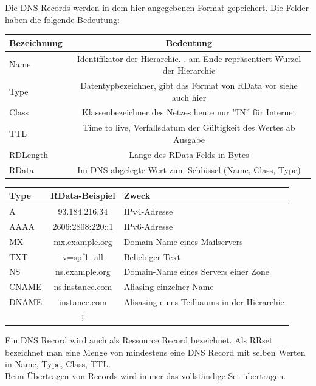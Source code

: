 \documentclass[a4paper,12pt,leqno]{article}
\begin{document}
Die DNS Records werden in dem \hyperref[pic:DNS-Record]{hier} angegebenen Format gepeichert.
Die Felder haben die folgende Bedeutung:\\

\begin{tabular}{|l|c|}
\hline
Bezeichnung & Bedeutung\\
\hline
Name & Identifikator der Hierarchie. . am Ende repräsentiert Wurzel der Hierarchie\\
Type & Datentypbezeichner, gibt das Format von RData vor siehe auch \hyperref[tab:RecordType]{hier}\\
Class & Klassenbezeichner des Netzes heute nur ''IN'' für Internet\\
\hline
TTL & Time to live, Verfallsdatum der Gültigkeit des Wertes ab Ausgabe\\
RDLength & Länge des RData Felds in Bytes\\
RData & Im DNS abgelegte Wert zum Schlüssel (Name, Class, Type)\\
\hline
\end{tabular}


{\label{tab:RecordType}
\begin{tabular}{|l|c|l|}
\hline
Type & RData-Beispiel & Zweck\\
\hline
A & 93.184.216.34 & IPv4-Adresse\\
AAAA & 2606:2808:220::1 & IPv6-Adresse\\
\hline
MX & mx.example.org & Domain-Name eines Mailservers\\
TXT & v=spf1 -all & Beliebiger Text\\
\hline
NS & ns.example.org & Domain-Name eines Servers einer Zone\\
CNAME & ns.instance.com & Aliasing einzelner Name\\
\hline
DNAME & instance.com & Alisasing eines Teilbaums in der Hierarchie\\
 & $\vdots$&\\
\hline
\end{tabular}
}

Ein DNS Record wird auch als Ressource Record bezeichnet. Als RRset bezeichnet man eine Menge von mindestens eine DNS Record mit selben Werten in Name, Type, Class, TTL.\\
Beim Übertragen von Records wird immer das vollständige Set übertragen.\\
\end{document}
